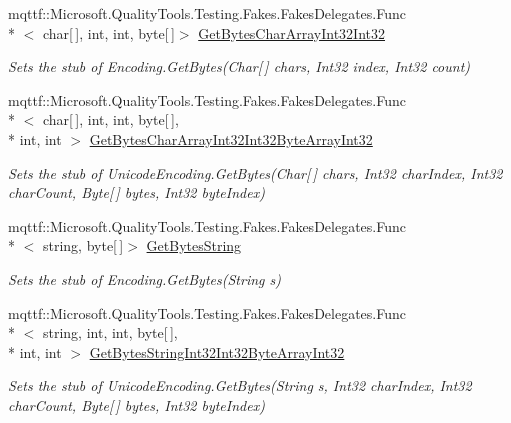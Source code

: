 \begin{DoxyCompactItemize}
mqttf\-::\-Microsoft.\-Quality\-Tools.\-Testing.\-Fakes.\-Fakes\-Delegates.\-Func\\*
$<$ char\mbox{[}$\,$\mbox{]}, int, int, byte\mbox{[}$\,$\mbox{]}$>$ \hyperlink{class_system_1_1_text_1_1_fakes_1_1_stub_unicode_encoding_a07ae9c07ebddadf44cf3fcc8be4a2f1e}{Get\-Bytes\-Char\-Array\-Int32\-Int32}
\begin{DoxyCompactList}\small\item\em Sets the stub of Encoding.\-Get\-Bytes(\-Char\mbox{[}$\,$\mbox{]} chars, Int32 index, Int32 count)\end{DoxyCompactList}\item 
mqttf\-::\-Microsoft.\-Quality\-Tools.\-Testing.\-Fakes.\-Fakes\-Delegates.\-Func\\*
$<$ char\mbox{[}$\,$\mbox{]}, int, int, byte\mbox{[}$\,$\mbox{]}, \\*
int, int $>$ \hyperlink{class_system_1_1_text_1_1_fakes_1_1_stub_unicode_encoding_ae44659d95f974299b64b6a416ff04481}{Get\-Bytes\-Char\-Array\-Int32\-Int32\-Byte\-Array\-Int32}
\begin{DoxyCompactList}\small\item\em Sets the stub of Unicode\-Encoding.\-Get\-Bytes(\-Char\mbox{[}$\,$\mbox{]} chars, Int32 char\-Index, Int32 char\-Count, Byte\mbox{[}$\,$\mbox{]} bytes, Int32 byte\-Index)\end{DoxyCompactList}\item 
mqttf\-::\-Microsoft.\-Quality\-Tools.\-Testing.\-Fakes.\-Fakes\-Delegates.\-Func\\*
$<$ string, byte\mbox{[}$\,$\mbox{]}$>$ \hyperlink{class_system_1_1_text_1_1_fakes_1_1_stub_unicode_encoding_a2e8bce207e8d4992c115023e925e0b47}{Get\-Bytes\-String}
\begin{DoxyCompactList}\small\item\em Sets the stub of Encoding.\-Get\-Bytes(\-String s)\end{DoxyCompactList}\item 
mqttf\-::\-Microsoft.\-Quality\-Tools.\-Testing.\-Fakes.\-Fakes\-Delegates.\-Func\\*
$<$ string, int, int, byte\mbox{[}$\,$\mbox{]}, \\*
int, int $>$ \hyperlink{class_system_1_1_text_1_1_fakes_1_1_stub_unicode_encoding_acc5008a9d0b16ad33dcca95acded8d94}{Get\-Bytes\-String\-Int32\-Int32\-Byte\-Array\-Int32}
\begin{DoxyCompactList}\small\item\em Sets the stub of Unicode\-Encoding.\-Get\-Bytes(\-String s, Int32 char\-Index, Int32 char\-Count, Byte\mbox{[}$\,$\mbox{]} bytes, Int32 byte\-Index)\end{DoxyCompactList}\item 

\end{DoxyCompactItemize}
